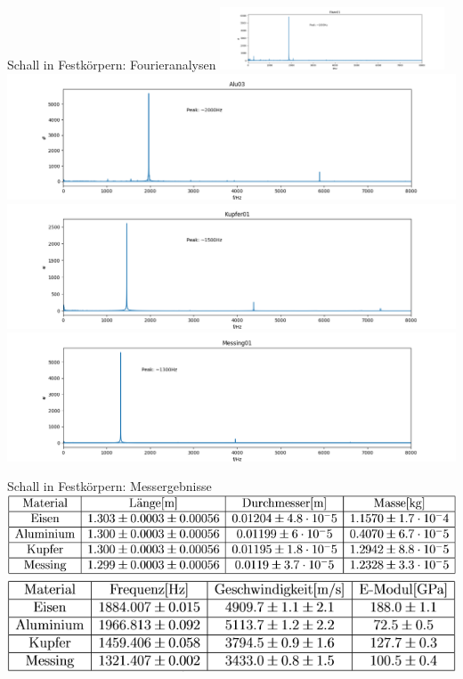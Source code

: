 \documentclass[12pt]{beamer}
\begin{document}
\begin{frame}{Schall in Festkörpern: Fourieranalysen}
	\includegraphics[width=0.5\textwidth, height=0.4\textheight]{Bilder/Eisen01_fourier.png}
	\includegraphics[width=0.5\linewidth,height=0.4\textheight]{Bilder/Alu03_fourier.png}\\
	\includegraphics[width=0.5\linewidth,height=0.4\textheight]{Bilder/Kupfer01_fourier.png}
	\includegraphics[width=0.5\linewidth,height=0.4\textheight]{Bilder/Messing01_fourier.png}\\
\end{frame}

\begin{frame}{Schall in Festkörpern: Messergebnisse}
	\includegraphics[width=\linewidth,height=\textheight,keepaspectratio]{Bilder/Material_Metalle.PNG}\\
	\includegraphics[width=\linewidth,height=\textheight,keepaspectratio]{Bilder/Ergebnisse_Metall.PNG}\\
	
\end{frame}
\end{document}

